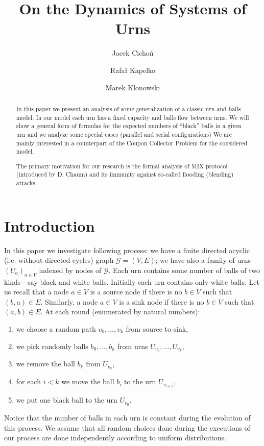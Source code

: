 \documentclass[submission]{dmtcs}
\title{
	On the Dynamics of Systems of Urns
}
\author{
	Jacek Cicho\'{n} \and 
	Rafa{\l} Kapelko \and 
	Marek Klonowski
}
\newcommand{\Marek} [1]{\marginpar{\scriptsize {\bf MKlo}:#1}}
\begin{document}
\maketitle

\begin{abstract}
In this paper we present an analysis of some generalization of a classic 
urn and balls model. In our model each urn has a fixed capacity 
and balls flow between urns. 
We will show a general form of formulas for the expected numbers of ``black'' balls in a 
given urn and we analyze some special cases (parallel and serial configurations)
We are mainly interested in a counterpart of the Coupon Collector Problem 
for the considered model. 

The primary motivation for our research is the formal analysis of  MIX protocol (introduced by D. Chaum) 
and its immunity against so-called flooding (blending) attacks. 
\end{abstract}


\section{Introduction}

In this paper we investigate following process: we have a finite directed 
acyclic (i.e. without directed cycles) graph  $\mathcal{G} = (V,E)$; we have also a family of urns 
$(U_a)_{a \in V}$ indexed by nodes of  $\mathcal{G}$. 
Each urn contains some number of balls of two kinds - say black and white balls.  
Initially each urn contains only white balls. 
Let us recall that a node $a\in V$ is a source node if there is no $b\in V$
such that $(b,a) \in E$. Similarly, a node $a\in V$ is a sink node 
if there is no $b\in V$ such that $(a,b) \in E$.
At each round (enumerated by natural numbers): 
\begin{enumerate}
\item we choose a random path $v_0,\ldots,v_k$ from source to sink, 
\item we pick randomly balls $b_0, \ldots, b_k$ from urns $U_{v_0}, \ldots, U_{v_k}$, 
\item we remove the ball  $b_k$ from $U_{v_k}$,
\item for each $i<k$ we move the ball $b_i$ to the urn  $U_{v_{i+1}}$,
\item we put one black ball to the urn $U_{v_0}$.
\end{enumerate}
Notice that the number of balls in each urn is constant during the evolution
of this process. We assume that all 
random choices done during the executions of our process are  done independently 
according to uniform distributions.
\end{document}
